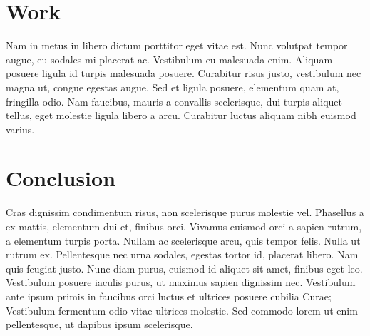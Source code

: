 \documentclass[12pt, letterpaper]{article}
\begin{document}
\section*{Work}
Nam in metus in libero dictum porttitor eget vitae est. Nunc volutpat tempor augue, eu sodales mi placerat ac. Vestibulum eu malesuada enim. Aliquam posuere ligula id turpis malesuada posuere. Curabitur risus justo, vestibulum nec magna ut, congue egestas augue. Sed et ligula posuere, elementum quam at, fringilla odio. Nam faucibus, mauris a convallis scelerisque, dui turpis aliquet tellus, eget molestie ligula libero a arcu. Curabitur luctus aliquam nibh euismod varius.

\section*{Conclusion}
Cras dignissim condimentum risus, non scelerisque purus molestie vel. Phasellus a ex mattis, elementum dui et, finibus orci. Vivamus euismod orci a sapien rutrum, a elementum turpis porta. Nullam ac scelerisque arcu, quis tempor felis. Nulla ut rutrum ex. Pellentesque nec urna sodales, egestas tortor id, placerat libero. Nam quis feugiat justo. Nunc diam purus, euismod id aliquet sit amet, finibus eget leo. Vestibulum posuere iaculis purus, ut maximus sapien dignissim nec. Vestibulum ante ipsum primis in faucibus orci luctus et ultrices posuere cubilia Curae; Vestibulum fermentum odio vitae ultrices molestie. Sed commodo lorem ut enim pellentesque, ut dapibus ipsum scelerisque. 
\end{document}
